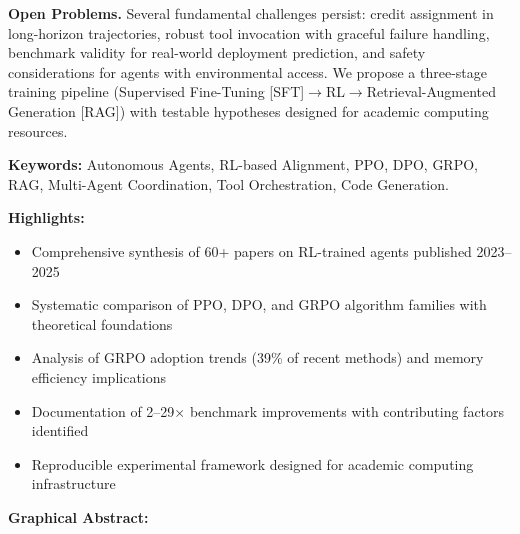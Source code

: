 \documentclass[12pt,a4paper]{report}
\theoremstyle{definition}
\begin{document}
\textbf{Open Problems.} Several fundamental challenges persist: credit assignment in long-horizon trajectories, robust tool invocation with graceful failure handling, benchmark validity for real-world deployment prediction, and safety considerations for agents with environmental access. We propose a three-stage training pipeline (Supervised Fine-Tuning [SFT]$\rightarrow$RL$\rightarrow$Retrieval-Augmented Generation [RAG]) with testable hypotheses designed for academic computing resources.

\vspace{0.6cm}
\noindent \textbf{Keywords:} Autonomous Agents, RL-based Alignment, PPO, DPO, GRPO, RAG, Multi-Agent Coordination, Tool Orchestration, Code Generation.

\vspace{0.4cm}
\noindent \textbf{Highlights:}
\begin{itemize}
    \item Comprehensive synthesis of 60+ papers on RL-trained agents published 2023--2025
    \item Systematic comparison of PPO, DPO, and GRPO algorithm families with theoretical foundations
    \item Analysis of GRPO adoption trends (39\% of recent methods) and memory efficiency implications
    \item Documentation of 2--29$\times$ benchmark improvements with contributing factors identified
    \item Reproducible experimental framework designed for academic computing infrastructure
\end{itemize}

\vspace{0.6cm}
\noindent \textbf{Graphical Abstract:}
\end{document}

